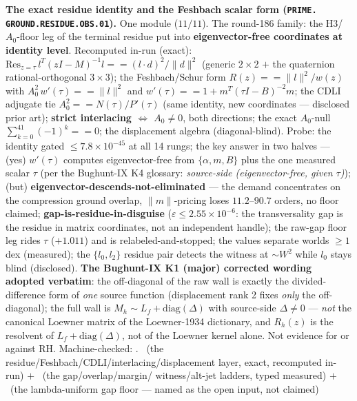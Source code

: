 \documentclass[11pt,a4paper]{article}
\theoremstyle{definition}
\begin{document}
\par\smallskip\noindent\textbf{The exact residue identity and the
Feshbach scalar form (\texttt{PRIME.\allowbreak
GROUND.\allowbreak RESIDUE.\allowbreak OBS.01}).}
One module ($11/11$).  The round-186 family: the H3/$A_0$-floor
leg of the terminal residue put into \textbf{eigenvector-free
coordinates at identity level}.  Recomputed in-run (exact):
$\mathrm{Res}_{z=\tau}\, l^T(zI - M)^{-1}l == (l\cdot
d)^2/\|d\|^2$ (generic $2\times 2$ $+$ the quaternion
rational-orthogonal $3\times 3$); the Feshbach/Schur form $R(z)
== \|l\|^2/w(z)$ with $A_0^2\,w'(\tau) == \|l\|^2$ and $w'(\tau)
== 1 + m^T(\tau I - B)^{-2}m$; the CDLI adjugate tie $A_0^2 ==
N(\tau)/P'(\tau)$ (same identity, new coordinates --- disclosed
prior art); \textbf{strict interlacing $\Leftrightarrow$ $A_0 \ne
0$}, both directions; the exact $A_0$-null
$\sum_{k=0}^{41}(-1)^k == 0$; the displacement algebra
(diagonal-blind).  Probe: the identity gated $\le
7.8\times10^{-45}$ at all 14 rungs; the key answer in two halves
--- (yes) $w'(\tau)$ computes eigenvector-free from $\{\alpha, m,
B\}$ plus the one measured scalar $\tau$ (per the Bughunt-IX K4
glossary: \emph{source-side (eigenvector-free, given $\tau$)});
(but) \textbf{eigenvector-descends-not-eliminated} --- the demand
concentrates on the compression ground overlap, $\|m\|$-pricing
loses $11.2$--$90.7$ orders, no floor claimed;
\textbf{gap-is-residue-in-disguise} ($\varepsilon \le
2.55\times10^{-6}$: the transversality gap is the residue in
matrix coordinates, not an independent handle); the raw-gap floor
leg rides $\tau$ ($+1.011$) and is relabeled-and-stopped; the
values separate worlds $\ge 1$ dex (measured); the $\{l_0, l_2\}$
residue pair detects the witness at ${\sim}W^2$ while $l_0$ stays
blind (disclosed).  \textbf{The Bughunt-IX K1 (major) corrected
wording adopted verbatim}: the off-diagonal of the raw wall is
exactly the divided-difference form of \emph{one} source function
(displacement rank 2 fixes \emph{only} the off-diagonal); the
full wall is $M_h \sim L_f + \mathrm{diag}(\Delta)$ with
source-side $\Delta \ne 0$ --- \emph{not} the canonical Loewner
matrix of the Loewner-1934 dictionary, and $R_h(z)$ is the
resolvent of $L_f + \mathrm{diag}(\Delta)$, not of the Loewner
kernel alone.  Not evidence for or against RH.
Machine-checked: .
\mE\ (the residue/Feshbach/CDLI/interlacing/displacement layer,
exact, recomputed in-run) $+$ \mC\ (the gap/overlap/margin/
witness/alt-jet ladders, typed measured) $+$ \mO\ (the
lambda-uniform gap floor --- named as the open input, not
claimed)
\par\smallskip
\end{document}
